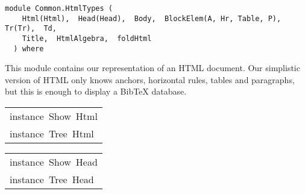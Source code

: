 \label{module:Common.HtmlTypes}
\haddockbeginheader
{\haddockverb\begin{verbatim}
module Common.HtmlTypes (
    Html(Html),  Head(Head),  Body,  BlockElem(A, Hr, Table, P),  Tr(Tr),  Td, 
    Title,  HtmlAlgebra,  foldHtml
  ) where\end{verbatim}}
\haddockendheader

This module contains our representation of an HTML document. Our 
 simplistic version of HTML only knows anchors, horizontal rules, tables and paragraphs, 
 but this is enough to display a BibTeX database. 
\par

\begin{haddockdesc}
\item[\begin{tabular}{@{}l}
instance\ Show\ Html\\instance\ Tree\ Html
\end{tabular}]
\end{haddockdesc}
\begin{haddockdesc}
\item[\begin{tabular}{@{}l}
instance\ Show\ Head\\instance\ Tree\ Head
\end{tabular}]
\end{haddockdesc}
